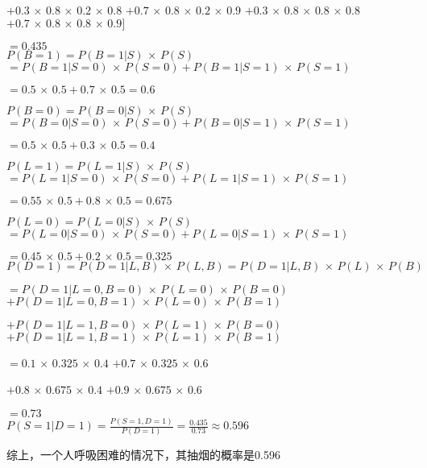\documentclass[UTF8]{ctexart}
\begin{document}
$+0.3\,×\,0.8\,×\,0.2 \,×\,0.8$
$+0.7\,×\,0.8\,×\,0.2 \,×\,0.9$
$+0.3\,×\,0.8\,×\,0.8\,×\, 0.8$
$+0.7\,×\,0.8\,×\,0.8\,×\,0.9]$

$=0.435$\\


$P(B=1)=P(B=1|S)\,×\,P(S)$
$=P(B=1|S=0)\,×\,P(S=0)+P(B=1|S=1)\,×\,P(S=1)$

$=0.5\,×\,0.5+0.7\,×\,0.5=0.6$

$P(B=0)=P(B=0|S)\,×\,P(S)$
$=P(B=0|S=0)\,×\,P(S=0)+P(B=0|S=1)\,×\,P(S=1)$

$=0.5\,×\,0.5+0.3\,×\,0.5=0.4$

$P(L=1)=P(L=1|S)\,×\,P(S)$
$=P(L=1|S=0)\,×\,P(S=0)+P(L=1|S=1)\,×\,P(S=1)$

$=0.55\,×\,0.5+0.8\,×\,0.5=0.675$

$P(L=0)=P(L=0|S)\,×\,P(S)$
$=P(L=0|S=0)\,×\,P(S=0)+P(L=0|S=1)\,×\,P(S=1)$

$=0.45\,×\,0.5+0.2\,×\,0.5=0.325$\\


$P(D=1)=P(D=1|L,B)\,×\,P(L,B)=P(D=1|L,B)\,×\,P(L)\,×\,P(B)$

$=P(D=1|L=0,B=0)\,×\,P(L=0)\,×\,P(B=0)$
$+P(D=1|L=0,B=1)\,×\,P(L=0)\,×\,P(B=1)$

$+P(D=1|L=1,B=0)\,×\,P(L=1)\,×\,P(B=0)$
$+P(D=1|L=1,B=1)\,×\,P(L=1)\,×\,P(B=1)$

$=0.1\,×\,0.325\,×\,0.4$
$+0.7\,×\,0.325\,×\,0.6$

$+0.8\,×\,0.675\,×\,0.4$
$+0.9\,×\,0.675\,×\,0.6$

$=0.73$\\


$\displaystyle{P(S=1|D=1)=\frac{P(S=1,D=1)}{P(D=1)}=\frac{0.435}{0.73}\approx 0.596}$

综上，一个人呼吸困难的情况下，其抽烟的概率是0.596
\end{document}

